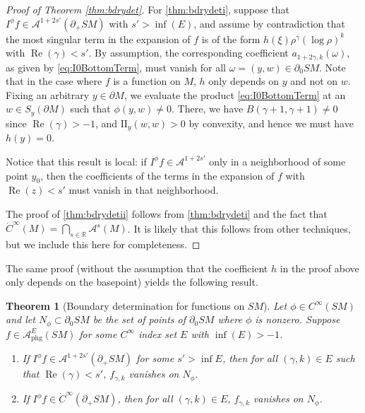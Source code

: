 \documentclass[11pt]{article}
\newenvironment{enumeratei}
{\bgroup\def\theenumi{\roman{enumi}}\def\theenumii{\arabic{enumii}}\begin{enumerate}}
{\end{enumerate}\egroup}
\DeclareMathOperator{\Real}{Re}
\theoremstyle{plain}
\newtheorem{Theorem}{Theorem}[section]
\theoremstyle{definition}
\theoremstyle{remark}
\def\Rm{{\mathbb{R}}}
\def\A{\mathcal{A}}
\def\two{\mathrm{II}}
\newcommand{\phg}{\mathrm{phg}}
\begin{document}
\begin{proof}[Proof of Theorem \ref{thm:bdrydet}]
For \eqref{thm:bdrydeti}, suppose that $I^\phi f \in \A^{1+2s'} (\partial_+ SM)$ with $s' > \inf(E)$, and assume by contradiction that the most singular term in the expansion of $f$ is of the form $h(\xi) \rho^\gamma (\log \rho)^k$ with $\Real(\gamma) < s'$. By assumption, the corresponding coefficient $a_{1+2\gamma, k}(\omega)$, as given by \eqref{eq:I0BottomTerm}, must vanish for all $\omega = (y,w)\in \partial_0 SM$. Note that in the case where $f$ is a function on $M$, $h$ only depends on $y$ and not on $w$. Fixing an arbitrary $y\in \partial M$, we evaluate the product \eqref{eq:I0BottomTerm} at an $w\in S_y (\partial M)$ such that $\phi(y,w) \ne 0$. There, we have $B(\gamma+1,\gamma+1) \neq 0$ since $\Real(\gamma)>-1$, and $\two_y(w,w) > 0$ by convexity, and hence we must have $h(y) = 0$.

Notice that this result is local: if $I^\phi f \in \A^{1+2s'}$ only in a neighborhood of some point $y_0$, then the coefficients of the terms in the expansion of $f$ with $\Real(z) < s'$ must vanish in that neighborhood.

The proof of \eqref{thm:bdrydetii} follows from \eqref{thm:bdrydeti} and the fact that $\dot{C}^\infty(M) = \bigcap_{s\in \Rm} \A^s(M)$. It is likely that this follows from other techniques, but we include this here for completeness.
\end{proof}

The same proof (without the assumption that the coefficient $h$ in the proof above only depends on the basepoint) yields the following result.

\begin{Theorem}[Boundary determination for functions on $SM$]\label{thm:bdrydetSM}
Let $\phi\in C^\infty(SM)$ and let $N_\phi \subset \partial_0 SM$ be the set of points of $\partial_0 SM$ where $\phi$ is nonzero.
Suppose $f\in \A^E_{\phg}(SM)$ for some $C^\infty$ index set $E$ with $\inf(E)>-1$.
\begin{enumeratei}
\item
If $I^\phi f \in \A^{1+2s'} (\partial_+ SM)$ for some $s'>\inf E$, then for all $(\gamma,k)\in E$ such that $\Real(\gamma)<s'$, $f_{\gamma,k}$ vanishes on $N_\phi$.

\item
If $I^\phi f \in \dot{C}^\infty (\partial_+ SM)$, then for all $(\gamma,k)\in E$, $f_{\gamma,k}$ vanishes on $N_\phi$.
\end{enumeratei}
\end{Theorem}
\end{document}
